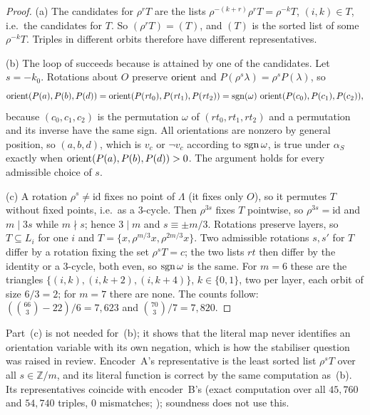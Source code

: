 \begin{proof}
(a) The candidates for $\rho^rT$ are the lists $\rho^{-(k+r)}\rho^rT=\rho^{-k}T$, $(i,k)\in T$, i.e.\ the candidates for
$T$. So $(\rho^rT)=$$(T)$, and $(T)$ is the sorted list of some $\rho^{-k}T$. Triples in
different orbits therefore have different representatives.

(b) The loop of  succeeds because  is attained by one of the candidates. Let $s=-k_0$. Rotations
about $O$ preserve $\operatorname{orient}$ and $P(\rho^s\lambda)=\rho^sP(\lambda)$, so
\[
\operatorname{orient}(P(a),P(b),P(d))=\operatorname{orient}(P(\mathit{rt}_0),P(\mathit{rt}_1),P(\mathit{rt}_2))
=\operatorname{sgn}(\omega)\,\operatorname{orient}(P(c_0),P(c_1),P(c_2)),
\]
because $(c_0,c_1,c_2)$ is the permutation $\omega$ of $(\mathit{rt}_0,\mathit{rt}_1,\mathit{rt}_2)$ and a permutation and
its inverse have the same sign. All orientations are nonzero by general position, so $(a,b,d)$, which is
$v_c$ or $\neg v_c$ according to $\operatorname{sgn}\omega$, is true under $\alpha_S$ exactly when $\operatorname{orient}(P(a),P(b),P(d))>0$. The
argument holds for every admissible choice of $s$.

(c) A rotation $\rho^s\ne\mathrm{id}$ fixes no point of $\Lambda$ (it fixes only $O$), so it permutes $T$ without fixed
points, i.e.\ as a $3$-cycle. Then $\rho^{3s}$ fixes $T$ pointwise, so $\rho^{3s}=\mathrm{id}$ and $m\mid3s$ while $m\nmid s$;
hence $3\mid m$ and $s\equiv\pm m/3$. Rotations preserve layers, so $T\subseteq L_i$ for one $i$ and
$T=\{x,\rho^{m/3}x,\rho^{2m/3}x\}$. Two admissible rotations $s,s'$ for $T$ differ by a rotation fixing the set
$\rho^{s}T=c$; the two lists $\mathit{rt}$ then differ by the identity or a $3$-cycle, both even, so $\operatorname{sgn}\omega$ is the
same. For $m=6$ these are the triangles $\{(i,k),(i,k+2),(i,k+4)\}$, $k\in\{0,1\}$, two per layer, each orbit of size
$6/3=2$; for $m=7$ there are none. The counts follow: $(\binom{66}{3}-22)/6=7{,}623$ and $\binom{70}{3}/7=7{,}820$.
\end{proof}

Part~(c) is not needed for~(b); it shows that the literal map never identifies an orientation variable with its own
negation, which is how the stabiliser question was raised in review. Encoder~A's representative is the least sorted
list $\rho^sT$ over all $s\in\mathbb Z/m$, and its literal function  is correct by the same computation as~(b).
Its representatives coincide with encoder~B's (exact computation over all $45{,}760$ and $54{,}740$ triples, $0$
mismatches; ); soundness does not use this.

